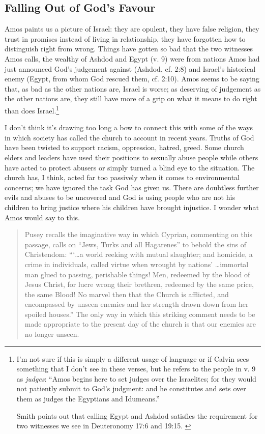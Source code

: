 \subsection{Falling Out of God's Favour}

Amos paints us a picture of Israel: they are opulent, they have false religion,
they trust in promises instead of living in relationship, they have forgotten
how to distinguish right from wrong. Things have gotten so bad that the two
witnesses Amos calls, the wealthy of Ashdod and Egypt (v. 9) were from nations
Amos had just announced God's judgement against (Ashdod, cf. 2:8) and Israel's
historical enemy (Egypt, from whom God rescued them, cf. 2:10). Amos seems to be
saying that, as bad as the other nations are, Israel is worse; as deserving of
judgement as the other nations are, they still have more of a grip on what it
means to do right than does Israel.\footnote{%
    I'm not sure if this is simply a different usage of language or if Calvin
    sees something that I don't see in these verses, but he refers to the people
    in v. 9 as \textit{judges}: \enquote{Amos begins here to set judges over the
    Israelites; for they would not patiently submit to God's judgment: and he
    constitutes and sets over them as judges the Egyptians and Idumeans.}
    \autocite[213]{calvin+owen:1986}

    Smith points out that calling Egypt and Ashdod satisfies the requirement for
    two witnesses we see in Deuteronomy 17:6 and 19:15.
    \autocite[161]{smith:2017}
}

I don't think it's drawing too long a bow to connect this with some of the ways
in which society has called the church to account in recent years. Truths of God
have been twisted to support racism, oppression, hatred, greed. Some church
elders and leaders have used their positions to sexually abuse people while
others have acted to protect abusers or simply turned a blind eye to the
situation. The church has, I think, acted far too passively when it comes to
environmental concerns; we have ignored the task God has given us. There are
doubtless further evils and abuses to be uncovered and God is using people who
are not his children to bring justice where his children have brought injustice.
I wonder what Amos would say to this.

\begin{quote}
    Pusey recalls the imaginative way in which Cyprian, commenting on this
    passage, calls on \enquote{Jews, Turks and all Hagarenes} to behold the sins
    of Christendom: \enquote{\enquote{\dots a world reeking with mutual
    slaughter; and homicide, a crime in individuals, called virtue when wrought
    by nations} \dots immortal man glued to passing, perishable things! Men,
    redeemed by the blood of Jesus Christ, for lucre wrong their brethren,
    redeemed by the same price, the same Blood! No marvel then that the Church
    is afflicted, and encompassed by unseen enemies and her strength drawn down
    from her spoiled houses.} The only way in which this striking comment needs
    to be made appropriate to the present day of the church is that our enemies
    are no longer unseen.
    \autocite[83]{motyer:2011}
\end{quote}

